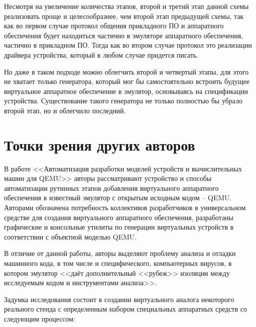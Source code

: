
Несмотря на увеличение количества этапов, второй и третий этап данной схемы реализовать проще и
целесообразнее, чем второй этап предыдущей схемы, так как во первом случае
протокол общения прикладного ПО и аппаратного обеспечения будет находиться частично в
эмуляторе аппаратного обеспечения, частично в прикладном ПО.
Тогда как во втором случае протокол это реализации драйвера устройства, который в любом случае придется писать.

Но даже в таком подходе можно облегчить второй и четвертый этапы, для этого не хватает только
генератора, который мог бы самостоятельно встроить будущее виртуальное аппаратное обеспечение
в эмулятор, основываясь на спецификации устройства.
Существование такого генератора не только полностью бы убрало второй этап, но и облегчило последний.


\section{Точки зрения других авторов}\label{sec:ch1/sec2}

В работе <<Автоматизация разработки моделей устройств и вычислительных машин для QEMU>> \cite{imposters}
авторы рассматривают устройство и способы автоматизации рутинных этапов добавления виртуального
аппаратного обеспечения в известный эмулятор с открытым исходным кодом -- QEMU.
Авторами обозначена потребность коллективов разработчиков в универсальном средстве
для создания виртуального аппаратного обеспечения,
разработаны графические и консольные утилиты по генерации виртуальных устройств
в соответствии с объектной моделью QEMU.

В отличие от данной работы, авторы выделяют проблему анализа и отладки машинного кода,
в том числе и специфического, компьютерных вирусов, в котором эмулятор <<даёт дополнительный
<<рубеж>> изоляции между исследуемым кодом и инструментами анализа>>.

Задумка исследования \cite{imposters} состоит в создании виртуального аналога некоторого реального стенда
с определенным набором специальных аппаратных средств со следующим процессом:

